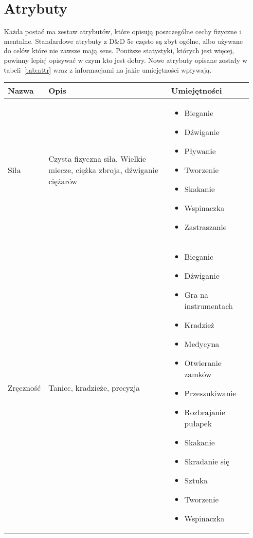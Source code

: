 \section{Atrybuty}
\label{ssec:attribs}

Każda postać ma zestaw atrybutów, które opisują poszczególne cechy fizyczne i
mentalne. Standardowe atrybuty z D\&D 5e często są zbyt ogólne, albo używane do
celów które nie zawsze mają sens. Poniższe statystyki, których jest więcej,
powinny lepiej opisywać w czym kto jest dobry.  Nowe atrybuty opisane zostały w
tabeli~\ref{tab:attr} wraz z informacjami na jakie umiejętności wpływają.

\begin{longtable}[c]{m{}m{}m{}}
	\toprule

	Nazwa        & Opis & Umiejętności \\* \midrule
	\endhead
	\endfoot
	\endlastfoot
	Siła &
	Czysta fizyczna siła. Wielkie miecze, ciężka zbroja, dźwiganie ciężarów &
	\begin{itemize}
		\item Bieganie
		\item Dźwiganie
		\item Pływanie
		\item Tworzenie
		\item Skakanie
		\item Wspinaczka
		\item Zastraszanie
	\end{itemize} \\ \midrule
	Zręczność &
	Taniec, kradzieże, precyzja &
	\begin{itemize}
		\item Bieganie
		\item Dźwiganie
		\item Gra na instrumentach
		\item Kradzież
		\item Medycyna
		\item Otwieranie zamków
		\item Przeszukiwanie
		\item Rozbrajanie pułapek
		\item Skakanie
		\item Skradanie się
		\item Sztuka
		\item Tworzenie
		\item Wspinaczka
	\end{itemize}\\\midrule

\end{longtable}
